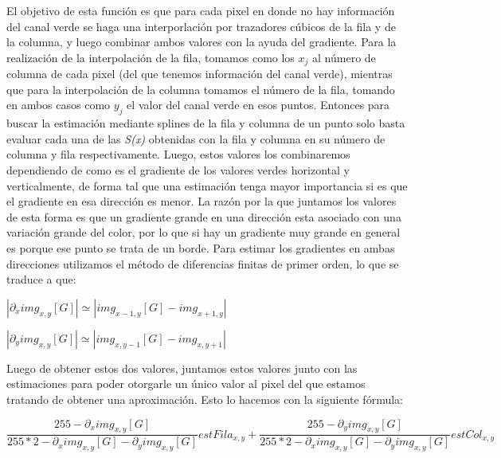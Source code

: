 \documentclass[10pt, a4paper]{article}
\begin{document}
El objetivo de esta funci\'on es que para cada pixel en donde no hay informaci\'on del canal verde se haga una interporlaci\'on por trazadores c\'ubicos de la fila y de la columna, y luego combinar ambos valores con la ayuda del gradiente. Para la realizaci\'on de la interpolaci\'on de la fila, tomamos como los $x_{j}$ al n\'umero de columna de cada pixel (del que tenemos informaci\'on del canal verde), mientras que para la interpolaci\'on de la columna tomamos el n\'umero de la fila, tomando en ambos casos como $y_{j}$ el valor del canal verde en esos puntos. Entonces para buscar la estimaci\'on mediante splines de la fila y columna de un punto solo basta evaluar cada una de las \textit{S(x)} obtenidas con la fila y columna en su n\'umero de columna y fila respectivamente. Luego, estos valores los combinaremos dependiendo de como es el gradiente de los valores verdes horizontal y verticalmente, de forma tal que una estimaci\'on tenga mayor importancia si es que el gradiente en esa direcci\'on es menor. La raz\'on por la que juntamos los valores de esta forma es que un gradiente grande en una direcci\'on esta asociado con una variaci\'on grande del color, por lo que si hay un gradiente muy grande en general es porque ese punto se trata de un borde. Para estimar los gradientes en ambas direcciones utilizamos el m\'etodo de diferencias finitas de primer orden, lo que se traduce a que:

\begin{center}
$|\partial_{x}img_{x,y}[G]| \simeq |img_{x-1,y}[G]-img_{x+1,y}|$

$|\partial_{y}img_{x,y}[G]| \simeq |img_{x,y-1}[G]-img_{x,y+1}|$
\end{center}

Luego de obtener estos dos valores, juntamos estos valores junto con las estimaciones para poder otorgarle un \'unico valor al pixel del que estamos tratando de obtener una aproximaci\'on. Esto lo hacemos con la siguiente f\'ormula:

\begin{center}
$\dfrac{255-\partial_{x}img_{x,y}[G]}{255*2-\partial_{x}img_{x,y}[G]-\partial_{y}img_{x,y}[G]}estFila_{x,y}+\dfrac{255-\partial_{y}img_{x,y}[G]}{255*2-\partial_{x}img_{x,y}[G]-\partial_{y}img_{x,y}[G]}estCol_{x,y}$
\end{center}
\end{document}
